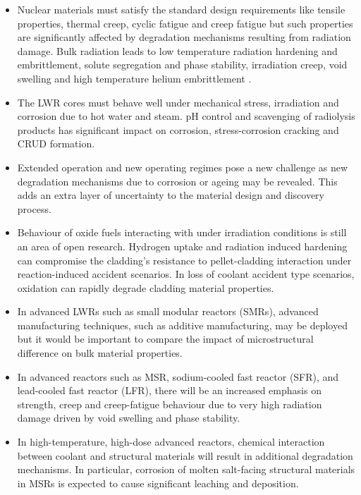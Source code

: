 	\begin{itemize}
		\item Nuclear materials must satisfy the standard design requirements like tensile properties, thermal creep, cyclic fatigue and creep fatigue but such properties are significantly affected by degradation mechanisms resulting from radiation damage. Bulk radiation leads to  low temperature radiation hardening and embrittlement, solute segregation and phase stability, irradiation creep, void swelling and high temperature helium embrittlement \cite{Olander:76,Was:2017aa}.
		\item The LWR cores must behave well under mechanical stress, irradiation and corrosion due to hot water and steam. pH control and scavenging of radiolysis products has significant impact on corrosion, stress-corrosion cracking and CRUD formation.
		\item Extended operation and new operating regimes pose a new challenge as new degradation mechanisms due to corrosion or ageing may be revealed. This adds an extra layer of uncertainty to the material design and discovery process.
		\item Behaviour of oxide fuels interacting with  under irradiation conditions is still an area of open research. Hydrogen uptake and radiation induced hardening can compromise the cladding's resistance to pellet-cladding interaction under reaction-induced accident scenarios. In loss of coolant accident type scenarios,  oxidation can rapidly degrade cladding material properties.
		\item In advanced LWRs such as small modular reactors (SMRs), advanced manufacturing techniques, such as additive manufacturing, may be deployed but it would be important to compare the impact of microstructural difference on bulk material properties.
		\item In advanced reactors such as MSR, sodium-cooled fast reactor (SFR), and lead-cooled fast reactor (LFR), there will be an increased emphasis on strength, creep and creep-fatigue behaviour due to very high radiation damage driven by void swelling and phase stability.
		\item In high-temperature, high-dose advanced reactors, chemical interaction between coolant and structural materials will result in additional degradation mechanisms. In particular, corrosion of molten salt-facing structural materials in MSRs is expected to cause significant leaching and deposition.
	\end{itemize}
	
